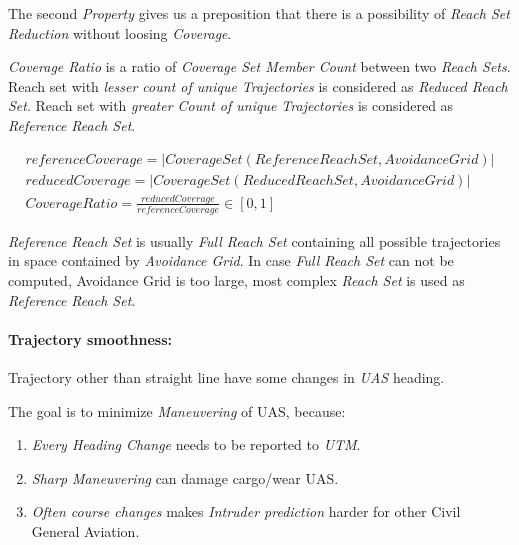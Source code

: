 The second \emph{Property} gives us a preposition that there is a possibility of \emph{Reach Set Reduction} without loosing 
\emph{Coverage}.  

\begin{definition}\label{def:coverageRatio}
    \emph{Coverage Ratio} is a ratio of \emph{Coverage Set Member Count} between two \emph{Reach Sets}. Reach set with \emph{lesser count of unique Trajectories} is considered as \emph{Reduced Reach Set}.  Reach set with \emph{greater Count of unique Trajectories} is considered as \emph{Reference Reach Set}.
    
    \begin{equation}\label{eq:CoverageRatio} 
        \begin{gathered}
            referenceCoverage=|CoverageSet(ReferenceReachSet,AvoidanceGrid)|\\
            reducedCoverage=|CoverageSet(ReducedReachSet,AvoidanceGrid)|\\
            CoverageRatio = \frac{reducedCoverage}{referenceCoverage}\in[0,1]
        \end{gathered}
    \end{equation}
\end{definition}

\begin{note}
    \emph{Reference Reach Set} is usually \emph{Full Reach Set} containing all possible trajectories in space contained by \emph{Avoidance Grid}. In case \emph{Full Reach Set} can not be computed, Avoidance Grid is too large, most complex \emph{Reach Set} is used as \emph{Reference Reach Set}.
\end{note}

\paragraph{Trajectory smoothness:} Trajectory other than straight line have some changes in \emph{UAS} heading. 

The goal is to minimize \emph{Maneuvering} of UAS, because:
\begin{enumerate}
    \item \emph{Every Heading Change} needs to be reported to \emph{UTM}.
    \item \emph{Sharp Maneuvering} can damage cargo/wear UAS.
    \item \emph{Often course changes} makes \emph{Intruder prediction} harder for other Civil General Aviation.
\end{enumerate}

